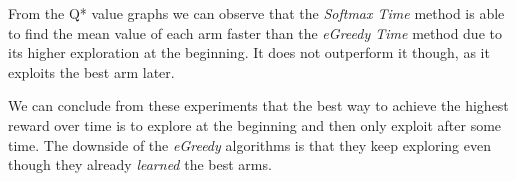 \documentclass[a4paper, 11pt]{article}
\begin{document}
From the Q* value graphs we can observe that the \textit{Softmax Time} method is able to find the mean value of each arm faster than the \textit{eGreedy Time} method due to its higher exploration at the beginning. It does not outperform it though, as it exploits the best arm later.

We can conclude from these experiments that the best way to achieve the highest reward over time is to explore at the beginning and then only exploit after some time. The downside of the \textit{eGreedy} algorithms is that they keep exploring even though they already \textit{learned} the best arms.
\end{document}
